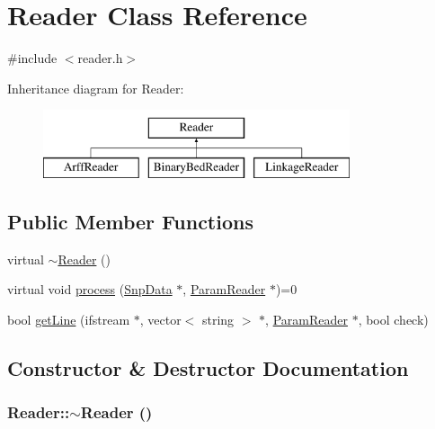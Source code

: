 \hypertarget{classReader}{
\section{Reader Class Reference}
\label{classReader}
}


{\ttfamily \#include $<$reader.h$>$}

Inheritance diagram for Reader:\begin{figure}[H]
\begin{center}
\leavevmode
\includegraphics[height=2cm]{classReader}
\end{center}
\end{figure}
\subsection*{Public Member Functions}
\begin{DoxyCompactItemize}
\item 
virtual \hyperlink{classReader_a78089542fd27a0ac2df6702fffe8725c}{$\sim$Reader} ()
\item 
virtual void \hyperlink{classReader_a334a724f607c84262af67759ffcdbd26}{process} (\hyperlink{classSnpData}{SnpData} $\ast$, \hyperlink{classParamReader}{ParamReader} $\ast$)=0
\item 
bool \hyperlink{classReader_af1812be4a38c094fd2a34a13b784e554}{getLine} (ifstream $\ast$, vector$<$ string $>$ $\ast$, \hyperlink{classParamReader}{ParamReader} $\ast$, bool check)
\end{DoxyCompactItemize}


\subsection{Constructor \& Destructor Documentation}
\hypertarget{classReader_a78089542fd27a0ac2df6702fffe8725c}{
\subsubsection[{$\sim$Reader}]{\setlength{\rightskip}{0pt plus 5cm}Reader::$\sim$Reader ()}}
\label{classReader_a78089542fd27a0ac2df6702fffe8725c}


